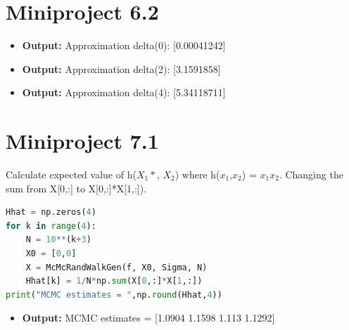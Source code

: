 \documentclass[a4paper]{article}
\begin{document}
\section*{Miniproject 6.2}
\begin{itemize}
	\item \textbf{Output: }Approximation delta(0): [0.00041242]
	\item \textbf{Output: }Approximation delta(2): [3.1591858]
	\item \textbf{Output: }Approximation delta(4): [5.34118711]
\end{itemize}

\newpage
\section{Miniproject 7.1}
Calculate expected value of h($X_1*$, $X_2$) where h($x_1$,$x_2$) = $x_1x_2$. Changing the sum from X[0,:] to X[0,:]*X[1,:]).
\begin{lstlisting}[language=Python]
Hhat = np.zeros(4) 
for k in range(4):
	N = 10**(k+3) 
	X0 = [0,0] 
	X = McMcRandWalkGen(f, X0, Sigma, N) 
	Hhat[k] = 1/N*np.sum(X[0,:]*X[1,:])
print("MCMC estimates = ",np.round(Hhat,4))
\end{lstlisting}

\begin{itemize}
	\item \textbf{Output: } MCMC estimates =  [1.0904 1.1598 1.113  1.1292]
\end{itemize}



\end{document}
